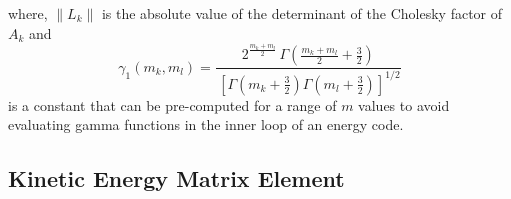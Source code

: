 \documentclass[12pt,doublespace]{article}
\begin{document}
where, $\left\| L_{k}\right\| $ is the absolute value of the determinant of
the Cholesky factor of $A_{k}$ and 
\begin{equation}
\gamma _{1}\left( m_{k},m_{l}\right) =\frac{2^{\frac{m_{k}+m_{l}}{2}%
}\,\Gamma \left( \frac{m_{k}+m_{l}}{2}+\frac{3}{2}\right) }{\,\left[ \Gamma
\left( m_{k}+\frac{3}{2}\right) \Gamma \left( m_{l}+\frac{3}{2}\right) %
\right] ^{1/2}}
\end{equation}
is a constant that can be pre-computed for a range of $m$ values to avoid
evaluating gamma functions in the inner loop of an energy code.

\subsection{Kinetic Energy Matrix Element}
\end{document}
